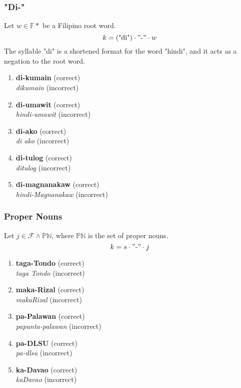 \subsubsection{"Di-"}

Let \(w \in \mathbb{F}*\) be a Filipino root word.
\[
      k = (\text{"di"}) \cdot "\text{-}" \cdot w
\]
The syllable "di" is a shortened format for the word "hindi", and it acts as a negation to the root word.
\begin{example}
\end{example}
\begin{enumerate}
      \item \textbf{di-kumain} (correct) \\
            \textit{dikumain} (incorrect)
      \item \textbf{di-umawit} (correct) \\
            \textit{hindi-umawit} (incorrect)
      \item \textbf{di-ako} (correct) \\
            \textit{di ako} (incorrect)
      \item \textbf{di-tulog} (correct) \\
            \textit{ditulog} (incorrect)
      \item \textbf{di-magnanakaw} (correct) \\
            \textit{hindi-Magnanakaw} (incorrect)
\end{enumerate}

\subsubsection{Proper Nouns}
\label{proper_nouns_chapter}
Let \(j \in \mathcal{F} \wedge \mathbb{PN}\), where \(\mathbb{PN}\) is the set of proper nouns.
\[
      k = s \cdot "\text{-}" \cdot j
\]
\begin{example}
\end{example}
\begin{enumerate}
      \item \textbf{taga-Tondo} (correct) \\
            \textit{taga Tondo} (incorrect)
      \item \textbf{maka-Rizal} (correct) \\
            \textit{makaRizal} (incorrect)
      \item \textbf{pa-Palawan} (correct) \\
            \textit{papunta-palawan} (incorrect)
      \item \textbf{pa-DLSU} (correct) \\
            \textit{pa-dlsu} (incorrect)
      \item \textbf{ka-Davao} (correct) \\
            \textit{kaDavao} (incorrect)
\end{enumerate}


